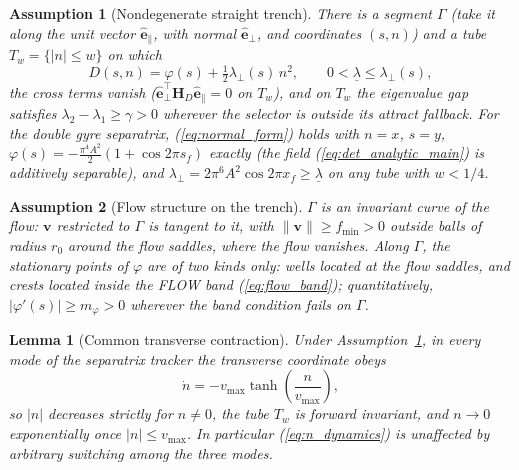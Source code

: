 \documentclass[lettersize,journal]{IEEEtran}
\newtheorem{lemma}{Lemma}
\newtheorem{assumption}{Assumption}
\begin{document}
\begin{assumption}[Nondegenerate straight trench]
\label{ass:trench}
There is a segment $\Gamma$ (take it along the unit vector
$\hat{\mathbf{e}}_\parallel$, with normal $\hat{\mathbf{e}}_\perp$, and
coordinates $(s, n)$) and a tube $T_w = \{|n| \leq w\}$ on which
\begin{equation}
    D(s, n) = \varphi(s) + \tfrac{1}{2}\lambda_\perp(s)\,n^2,
    \qquad 0 < \underline{\lambda} \leq \lambda_\perp(s),
    \label{eq:normal_form}
\end{equation}
the cross terms vanish
($\hat{\mathbf{e}}_\perp^\top \mathbf{H}_D \hat{\mathbf{e}}_\parallel
= 0$ on $T_w$), and on $T_w$ the eigenvalue gap satisfies
$\lambda_2 - \lambda_1 \geq \gamma > 0$ wherever the selector is
outside its attract fallback. For the double gyre separatrix,
(\ref{eq:normal_form}) holds with $n = x$, $s = y$, $\varphi(s) =
-\tfrac{\pi^4 A^2}{2}(1 + \cos 2\pi s_f)$ exactly (the field
(\ref{eq:det_analytic_main}) is additively separable), and
$\lambda_\perp = 2\pi^6 A^2 \cos 2\pi x_f \geq \underline{\lambda}$ on
any tube with $w < 1/4$.
\end{assumption}

\begin{assumption}[Flow structure on the trench]
\label{ass:flow}
$\Gamma$ is an invariant curve of the flow: $\mathbf{v}$ restricted to
$\Gamma$ is tangent to it, with $\|\mathbf{v}\| \geq f_{\min} > 0$
outside balls of radius $r_0$ around the flow saddles, where the flow
vanishes. Along $\Gamma$, the stationary points of $\varphi$ are of two
kinds only: wells located at the flow saddles, and crests located inside
the FLOW band (\ref{eq:flow_band}); quantitatively, $|\varphi'(s)| \geq
m_\varphi > 0$ wherever the band condition fails on $\Gamma$.
\end{assumption}

\begin{lemma}[Common transverse contraction]
\label{lem:transverse}
Under Assumption~\ref{ass:trench}, in every mode of the separatrix
tracker the transverse coordinate obeys
\begin{equation}
    \dot{n} = -v_{\max}\tanh\!\left(\frac{n}{v_{\max}}\right),
    \label{eq:n_dynamics}
\end{equation}
so $|n|$ decreases strictly for $n \neq 0$, the tube $T_w$ is forward
invariant, and $n \to 0$ exponentially once $|n| \leq v_{\max}$. In
particular (\ref{eq:n_dynamics}) is unaffected by arbitrary switching
among the three modes.
\end{lemma}
\end{document}
